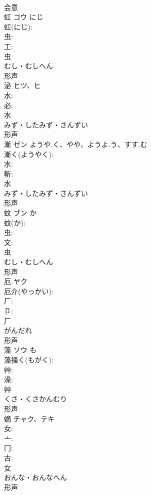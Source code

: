 \documentclass[8pt]{extreport}
\begin{document}
\begin{CJK}{UTF8}{min}
\\	会意 
\\	虹	コウ	にじ		
\\	虹(にじ): 
\\	虫: 
\\	工: 
\\	虫	
\\	むし・むしへん	
\\	形声 
\\	泌	ヒツ、ヒ			
\\	水: 
\\	必: 
\\	水	
\\	みず・したみず・さんずい	
\\	形声 
\\	漸	ゼン	ようや.く、やや、ようよ.う、すす.む		
\\	漸く(ようやく): 
\\	水: 
\\	斬: 
\\	水	
\\	みず・したみず・さんずい	
\\	形声 
\\	蚊	ブン	か		
\\	蚊(か): 
\\	虫: 
\\	文: 
\\	虫	
\\	むし・むしへん	
\\	形声 
\\	厄	ヤク			
\\	厄介(やっかい): 
\\	厂: 
\\	卩: 
\\	厂	
\\	がんだれ	
\\	形声 
\\	藻	ソウ	も		
\\	藻掻く(もがく): 
\\	艸: 
\\	澡: 
\\	艸	
\\	くさ・くさかんむり	
\\	形声 
\\	嫡	チャク、テキ			
\\	女: 
\\	亠: 
\\	冂: 
\\	古: 
\\	女	
\\	おんな・おんなへん	
\\	形声 

\end{CJK}
\end{document}
